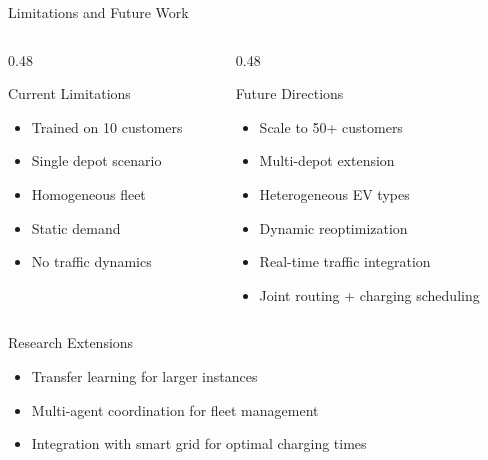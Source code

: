 \documentclass[aspectratio=169,11pt]{beamer}
\begin{document}
\begin{frame}{Limitations and Future Work}
    \begin{columns}[T]
        \begin{column}{0.48\textwidth}
            \begin{alertblock}{Current Limitations}
                \begin{itemize}
                    \item Trained on 10 customers
                    \item Single depot scenario
                    \item Homogeneous fleet
                    \item Static demand
                    \item No traffic dynamics
                \end{itemize}
            \end{alertblock}
        \end{column}
        \begin{column}{0.48\textwidth}
            \begin{exampleblock}{Future Directions}
                \begin{itemize}
                    \item Scale to 50+ customers
                    \item Multi-depot extension
                    \item Heterogeneous EV types
                    \item Dynamic reoptimization
                    \item Real-time traffic integration
                    \item Joint routing + charging scheduling
                \end{itemize}
            \end{exampleblock}
        \end{column}
    \end{columns}
    
    \vspace{0.5cm}
    \begin{block}{Research Extensions}
        \begin{itemize}
            \item Transfer learning for larger instances
            \item Multi-agent coordination for fleet management
            \item Integration with smart grid for optimal charging times
        \end{itemize}
    \end{block}
\end{frame}
\end{document}

